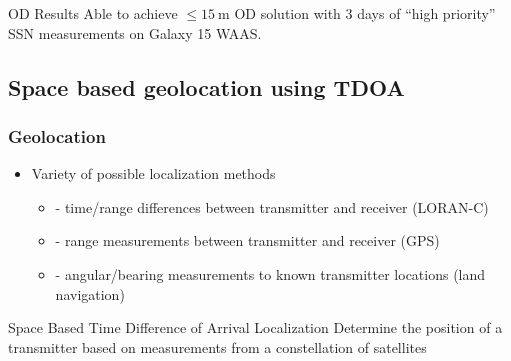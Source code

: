 \begin{frame}[t]
\begin{columns}
\begin{column}{0.5\textwidth}
\begin{center}
        \end{center}
    \end{column}
    \end{columns}
    \begin{block}{OD Results}
        Able to achieve \( \leq \SI{15}{\meter} \) OD solution with 3 days of ``high priority'' SSN measurements on Galaxy 15 WAAS.
    \end{block}
\end{frame}

\subsection[Space TDOA]{Space based geolocation using TDOA}

\begin{frame}[t]\frametitle{Geolocation}
    \begin{itemize}
        \item Variety of possible localization methods
        \begin{itemize}
            \item {} - time/range differences between transmitter and receiver (LORAN-C)
            \item {} - range measurements between transmitter and receiver (GPS)
            \item {} - angular/bearing measurements to known transmitter locations (land navigation)
        \end{itemize}
    \end{itemize}

    \begin{block}{Space Based Time Difference of Arrival Localization}
        Determine the position of a transmitter based on measurements from a constellation of satellites
    \end{block}
\end{frame}

